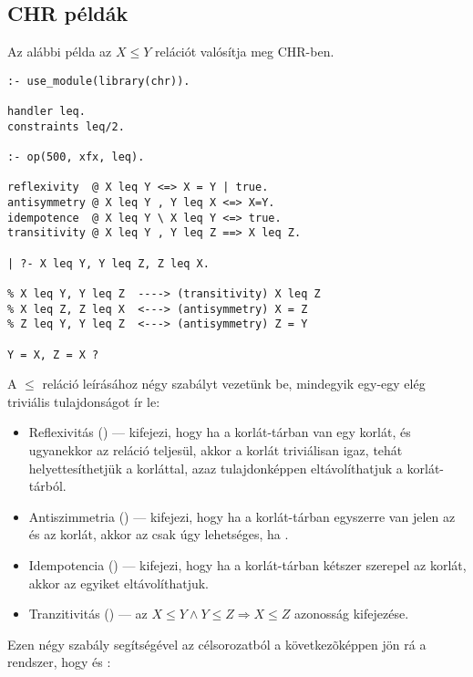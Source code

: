 \subsection{CHR példák}

Az alábbi példa az $X \leq Y$ relációt valósítja meg CHR-ben.
\begin{verbatim}
:- use_module(library(chr)).

handler leq.
constraints leq/2.

:- op(500, xfx, leq).

reflexivity  @ X leq Y <=> X = Y | true.
antisymmetry @ X leq Y , Y leq X <=> X=Y.
idempotence  @ X leq Y \ X leq Y <=> true.
transitivity @ X leq Y , Y leq Z ==> X leq Z.

| ?- X leq Y, Y leq Z, Z leq X.

% X leq Y, Y leq Z  ----> (transitivity) X leq Z
% X leq Z, Z leq X  <---> (antisymmetry) X = Z
% Z leq Y, Y leq Z  <---> (antisymmetry) Z = Y

Y = X, Z = X ? 
\end{verbatim}

A $\leq$ reláció leírásához négy szabályt vezetünk be, mindegyik egy-egy elég
triviális tulajdonságot ír le:

\begin{itemize}
\item Reflexivitás () --- kifejezi, hogy ha a korlát-tárban van
egy  korlát, és ugyanekkor az  reláció teljesül, akkor
a korlát triviálisan igaz, tehát helyettesíthetjük a  korláttal, azaz
tulajdonképpen eltávolíthatjuk a korlát-tárból.

\item Antiszimmetria () --- kifejezi, hogy ha a korlát-tárban
egyszerre van jelen az  és az  korlát, akkor az csak úgy
lehetséges, ha .

\item Idempotencia () --- kifejezi, hogy ha a korlát-tárban
kétszer szerepel az  korlát, akkor az egyiket eltávolíthatjuk.

\item Tranzitivitás () --- az
$X \leq Y \wedge Y \leq Z \Longrightarrow X \leq Z$ azonosság kifejezése.
\end{itemize}

Ezen négy szabály segítségével az  célsorozatból
a következõképpen jön rá a rendszer, hogy  és :

